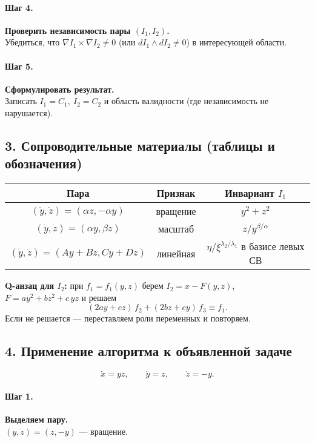 \paragraph{Шаг 4.} \textbf{Проверить независимость пары $(I_1,I_2)$.}\\
Убедиться, что $\nabla I_1\times \nabla I_2\neq 0$ (или $dI_1\wedge dI_2\neq 0$) в интересующей области.

\paragraph{Шаг 5.} \textbf{Сформулировать результат.}\\
Записать $\boxed{I_1=C_1,\ I_2=C_2}$ и область валидности (где независимость не нарушается).

\subsection*{3. Сопроводительные материалы (таблицы и обозначения)}

\begin{center}
\begin{tabular}{|c|c|c|}
\hline
\textbf{Пара} & \textbf{Признак} & \textbf{Инвариант } $I_1$ \\
\hline
$(\dot y,\dot z)=(\alpha z,-\alpha y)$ & вращение & $y^2+z^2$ \\
\hline
$(\dot y,\dot z)=(\alpha y,\beta z)$ & масштаб & $z/y^{\beta/\alpha}$ \\
\hline
$(\dot y,\dot z)=(Ay+Bz,Cy+Dz)$ & линейная & $\eta/\xi^{\lambda_2/\lambda_1}$ в базисе левых СВ \\
\hline
\end{tabular}
\end{center}

\vspace{4pt}

\noindent\textbf{Q-анзац для $I_2$:} при $f_1=f_1(y,z)$ берем $I_2=x-F(y,z)$, $F=a y^2+b z^2+c\,yz$ и решаем
\[
(2a y+c z)\,f_2+(2b z+c y)\,f_3\equiv f_1.
\]
Если не решается — переставляем роли переменных и повторяем.

\subsection*{4. Применение алгоритма к объявленной задаче}

\[
\dot x = y z,\qquad \dot y = z,\qquad \dot z = -y.
\]

\paragraph{Шаг 1.} \textbf{Выделяем пару.}\\
$(\dot y,\dot z)=(z,-y)$ — вращение.

